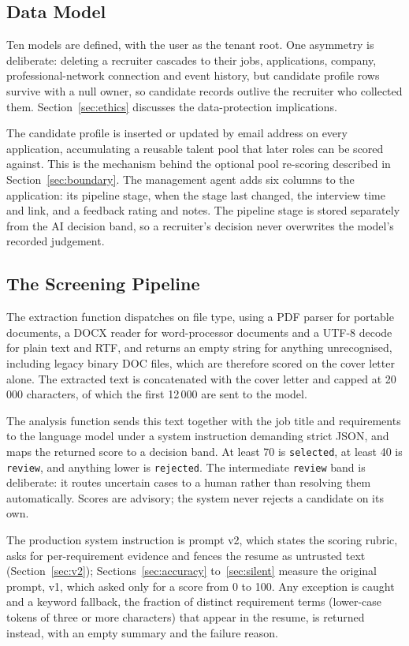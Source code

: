 \documentclass[conference]{IEEEtran}
\begin{document}
\subsection{Data Model}

Ten models are defined, with the user as the tenant root. One asymmetry is
deliberate: deleting a recruiter cascades to their jobs, applications, company,
professional-network connection and event history, but candidate profile rows
survive with a null owner, so candidate records outlive the recruiter who
collected them. Section~\ref{sec:ethics} discusses the data-protection
implications.

The candidate profile is inserted or updated by email address on every
application, accumulating a reusable talent pool that later roles can be scored
against. This is the mechanism behind the optional pool re-scoring described in
Section~\ref{sec:boundary}. The management agent adds six columns to the
application: its pipeline stage, when the stage last changed, the interview time
and link, and a feedback rating and notes. The pipeline stage is stored
separately from the AI decision band, so a recruiter's decision never overwrites
the model's recorded judgement.

\subsection{The Screening Pipeline}

The extraction function dispatches on file type, using a PDF parser for portable
documents, a DOCX reader for word-processor documents and a UTF-8 decode for
plain text and RTF, and returns an empty string for anything unrecognised,
including legacy binary DOC files, which are therefore scored on the cover letter
alone. The extracted text is concatenated with the cover letter and capped at
20\,000 characters, of which the first 12\,000 are sent to the model.

The analysis function sends this text together with the job title and
requirements to the language model under a system instruction demanding strict
JSON, and maps the returned score to a decision band. At least 70 is
\texttt{selected}, at least 40 is \texttt{review}, and anything lower is
\texttt{rejected}. The intermediate \texttt{review} band is deliberate: it
routes uncertain cases to a human rather than resolving them automatically.
Scores are advisory; the system never rejects a candidate on its own.

The production system instruction is prompt v2, which states the scoring rubric,
asks for per-requirement evidence and fences the resume as untrusted text
(Section~\ref{sec:v2}); Sections~\ref{sec:accuracy} to~\ref{sec:silent} measure
the original prompt, v1, which asked only for a score from 0 to 100. Any
exception is caught and a keyword fallback, the fraction of distinct requirement
terms (lower-case tokens of three or more characters) that appear in the resume,
is returned instead, with an empty summary and the failure reason.
\end{document}
